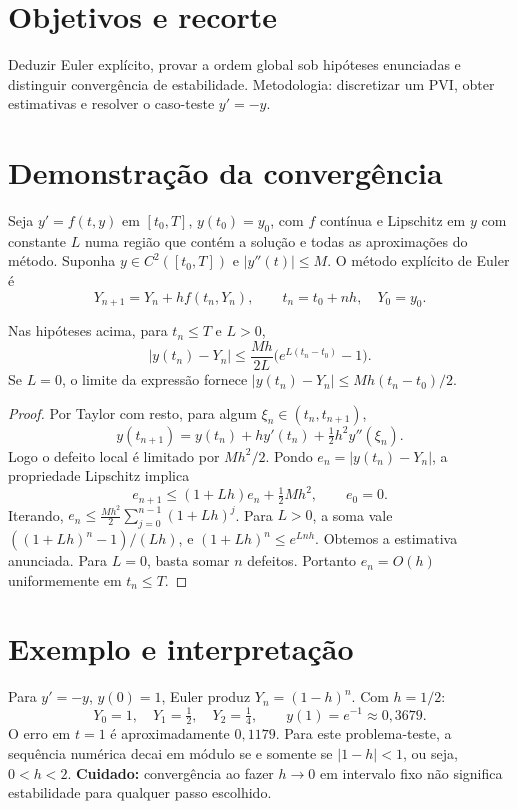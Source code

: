 \documentclass[11pt,a4paper]{article}
\begin{document}
\section{Objetivos e recorte}
Deduzir Euler explícito, provar a ordem global sob hipóteses enunciadas e distinguir convergência de estabilidade. Metodologia: discretizar um PVI, obter estimativas e resolver o caso-teste $y'=-y$.
\section{Demonstração da convergência}
Seja $y'=f(t,y)$ em $[t_0,T]$, $y(t_0)=y_0$, com $f$ contínua e Lipschitz em $y$ com constante $L$ numa região que contém a solução e todas as aproximações do método. Suponha $y\in C^2([t_0,T])$ e $|y''(t)|\le M$. O método explícito de Euler é
\[
Y_{n+1}=Y_n+hf(t_n,Y_n),\qquad t_n=t_0+nh,\quad Y_0=y_0.
\]
\begin{proposicao}
Nas hipóteses acima, para $t_n\le T$ e $L>0$,
\[
|y(t_n)-Y_n|\le \frac{Mh}{2L}\bigl(e^{L(t_n-t_0)}-1\bigr).
\]
Se $L=0$, o limite da expressão fornece $|y(t_n)-Y_n|\le Mh(t_n-t_0)/2$.
\end{proposicao}
\begin{proof}
Por Taylor com resto, para algum $\xi_n\in(t_n,t_{n+1})$,
\[
y(t_{n+1})=y(t_n)+hy'(t_n)+\tfrac12h^2y''(\xi_n).
\]
Logo o defeito local é limitado por $Mh^2/2$. Pondo $e_n=|y(t_n)-Y_n|$, a propriedade Lipschitz implica
\[
e_{n+1}\le(1+Lh)e_n+\tfrac12Mh^2,\qquad e_0=0.
\]
Iterando, $e_n\le\frac{Mh^2}{2}\sum_{j=0}^{n-1}(1+Lh)^j$.
Para $L>0$, a soma vale $((1+Lh)^n-1)/(Lh)$, e
$(1+Lh)^n\le e^{Lnh}$. Obtemos a estimativa anunciada. Para $L=0$, basta somar $n$ defeitos. Portanto $e_n=O(h)$ uniformemente em $t_n\le T$.
\end{proof}
\section{Exemplo e interpretação}
Para $y'=-y$, $y(0)=1$, Euler produz $Y_n=(1-h)^n$. Com $h=1/2$:
\[
Y_0=1,\quad Y_1=\tfrac12,\quad Y_2=\tfrac14,\qquad y(1)=e^{-1}\approx0{,}3679.
\]
O erro em $t=1$ é aproximadamente $0{,}1179$. Para este problema-teste, a sequência numérica decai em módulo se e somente se $|1-h|<1$, ou seja, $0<h<2$. \textbf{Cuidado:} convergência ao fazer $h\to0$ em intervalo fixo não significa estabilidade para qualquer passo escolhido.
\end{document}
